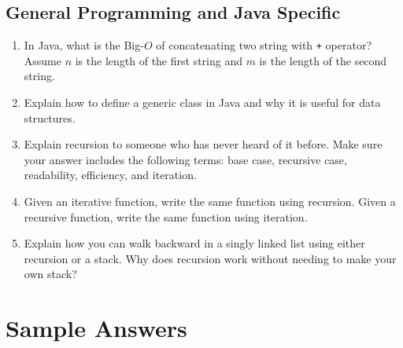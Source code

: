 \documentclass[10pt]{article}
\begin{document}
\subsection{General Programming and Java Specific}
\begin{enumerate}[leftmargin=0em]\addtocounter{enumi}{39}
\item In Java, what is the Big-$O$ of concatenating two string with \texttt{+}  operator? Assume $n$ is the length of the first string and $m$ is the length of the second string.
\item Explain how to define a generic class in Java and why it is useful for data structures.
\item Explain recursion to someone who has never heard of it before. Make sure your answer includes the following terms: base case, recursive case, readability, efficiency, and iteration.
\item Given an iterative function, write the same function using recursion. Given a recursive function, write the same function using iteration.
\item Explain how you can walk backward in a singly linked list using either recursion or a stack. Why does recursion work without needing to make your own stack?
\end{enumerate}












\pagebreak



















\section{Sample Answers}
\end{document}
